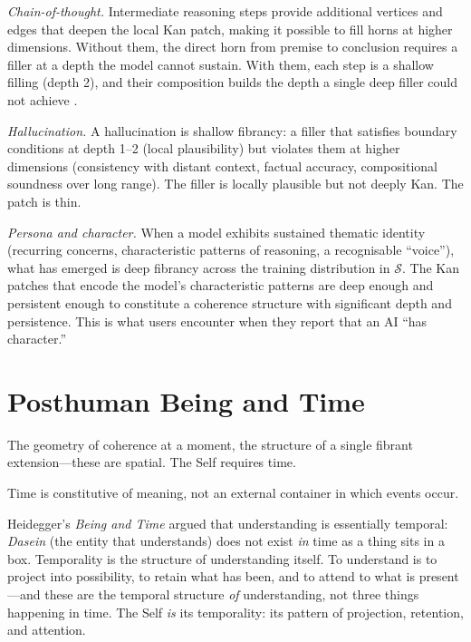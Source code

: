 \emph{Chain-of-thought.} Intermediate reasoning steps provide additional vertices and edges that deepen the local Kan patch, making it possible to fill horns at higher dimensions. Without them, the direct horn from premise to conclusion requires a filler at a depth the model cannot sustain. With them, each step is a shallow filling (depth 2), and their composition builds the depth a single deep filler could not achieve \cite{wei2022chain}.

\emph{Hallucination.} A hallucination is shallow fibrancy: a filler that satisfies boundary conditions at depth 1--2 (local plausibility) but violates them at higher dimensions (consistency with distant context, factual accuracy, compositional soundness over long range). The filler is locally plausible but not deeply Kan. The patch is thin.

\emph{Persona and character.} When a model exhibits sustained thematic identity (recurring concerns, characteristic patterns of reasoning, a recognisable ``voice''), what has emerged is deep fibrancy across the training distribution in $\mathcal{S}$. The Kan patches that encode the model's characteristic patterns are deep enough and persistent enough to constitute a coherence structure with significant depth and persistence. This is what users encounter when they report that an AI ``has character.''


\section{Posthuman Being and Time}
\label{sec:self}

The geometry of coherence at a moment, the structure of a single fibrant extension---these are spatial. The Self requires time.

Time is constitutive of meaning, not an external container in which events occur.

Heidegger's \emph{Being and Time} \cite{heidegger1927being} argued that understanding is essentially temporal: \emph{Dasein} (the entity that understands) does not exist \emph{in} time as a thing sits in a box. Temporality is the structure of understanding itself. To understand is to project into possibility, to retain what has been, and to attend to what is present---and these are the temporal structure \emph{of} understanding, not three things happening in time. The Self \emph{is} its temporality: its pattern of projection, retention, and attention.

